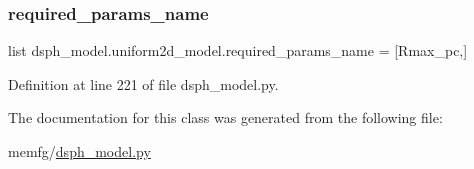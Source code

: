\subsubsection{\texorpdfstring{required\+\_\+params\+\_\+name}{required\_params\_name}}
{\footnotesize\ttfamily list dsph\+\_\+model.\+uniform2d\+\_\+model.\+required\+\_\+params\+\_\+name = \mbox{[}\textquotesingle{}Rmax\+\_\+pc\textquotesingle{},\mbox{]}\hspace{0.3cm}{\ttfamily [static]}}



Definition at line 221 of file dsph\+\_\+model.\+py.



The documentation for this class was generated from the following file\+:\begin{DoxyCompactItemize}
\item 
memfg/\hyperlink{dsph__model_8py}{dsph\+\_\+model.\+py}\end{DoxyCompactItemize}
